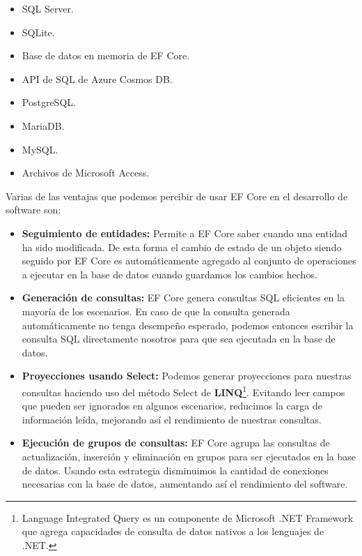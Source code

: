 \begin{itemize}
	\item SQL Server.
    \item SQLite.
    \item Base de datos en memoria de EF Core.
    \item API de SQL de Azure Cosmos DB.
    \item PostgreSQL.
    \item MariaDB.
    \item MySQL.
    \item Archivos de Microsoft Access.
    
\end{itemize}

Varias de las ventajas que podemos percibir de usar EF Core en el desarrollo de software son:

\begin{itemize}
	\item \textbf{Seguimiento de entidades:} Permite a EF Core saber cuando una entidad ha sido modificada. De esta forma el cambio de estado de un objeto siendo seguido por EF Core es automáticamente agregado al conjunto de operaciones a ejecutar en la base de datos cuando guardamos los cambios hechos.
    \item \textbf{Generación de consultas:} EF Core genera consultas SQL eficientes en la mayoría de los escenarios. En caso de que la consulta generada automáticamente no tenga desempeño esperado, podemos entonces escribir la consulta SQL directamente nosotros para que sea ejecutada en la base de datos.
    \item \textbf{Proyecciones usando Select:} Podemos generar proyecciones para nuestras consultas haciendo uso del método Select de \textbf{LINQ}\footnote{Language Integrated Query es un componente de Microsoft .NET Framework que agrega capacidades de consulta de datos nativos a los lenguajes de .NET.}. Evitando leer campos que pueden ser ignorados en algunos escenarios, reducimos la carga de información leída, mejorando así el rendimiento de nuestras consultas.
    \item \textbf{Ejecución de grupos de consultas:} EF Core agrupa las consultas de actualización, inserción y eliminación en grupos para ser ejecutados en la base de datos. Usando esta estrategia disminuimos la cantidad de conexiones necesarias con la base de datos, aumentando así el rendimiento del software.
    
\end{itemize}

